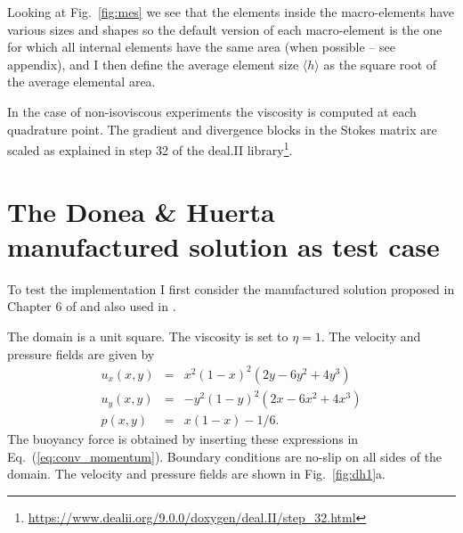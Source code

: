 \documentclass[a4paper,12pt]{article}
\begin{document}
Looking at Fig.~\ref{fig:mes} we see that the elements inside the macro-elements 
have various sizes and shapes so 
the default version of each macro-element is the one for which all internal elements have the same area
(when possible -- see appendix), and I then define the average element size
$\langle h \rangle$ as the square root of the average elemental area.

In the case of non-isoviscous experiments the viscosity is computed at each 
quadrature point. The gradient and divergence blocks in the Stokes matrix are
scaled as explained in step 32 of the deal.II library\footnote{\url{https://www.dealii.org/9.0.0/doxygen/deal.II/step_32.html}}.

\section{The Donea \& Huerta manufactured solution as test case}

To test the implementation I first consider the manufactured solution 
proposed in Chapter 6 of \cite{dohu03} and also used in \cite{thba22,thba25}.
 
The domain is a unit square. The viscosity is set to $\eta=1$.
The velocity and pressure fields are given by
\begin{eqnarray}
u_x(x,y) &=& x^2(1- x)^2 (2y - 6y^2 + 4y^3)  \\
u_y(x,y) &=& -y^2 (1 - y)^2 (2x - 6x^2 + 4x^3) \\
p(x,y) &=& x(1 -x)- 1/6. 
\end{eqnarray}
The buoyancy force is obtained by inserting these expressions in Eq.~(\ref{eq:conv_momentum}).
Boundary conditions are no-slip on all sides of the domain.
The velocity and pressure fields are shown in Fig.~\ref{fig:dh1}a.
\end{document}
